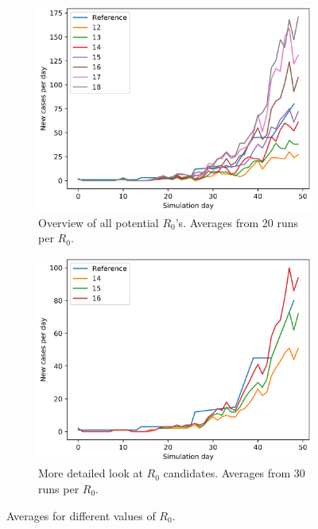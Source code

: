 \documentclass[runningheads]{llncs}
\begin{document}
\begin{figure}[H]
	\centering
	\begin{subfigure}[b]{0.7\linewidth}
		\includegraphics[width=\textwidth]{R0_all_20runs.eps}
		\caption{Overview of all potential $R_0$'s. Averages from 20 runs per $R_0$.} 	
	\end{subfigure}
	\begin{subfigure}[b]{0.7\linewidth}
		\includegraphics[width=\textwidth]{R0_detail_30runs.eps}
		\caption{More detailed look at $R_0$ candidates. Averages from 30 runs per $R_0$.} 
	\end{subfigure}
	\caption{Averages for different values of $R_0$.}
	\label{R0EstPlot}
\end{figure}
\end{document}
